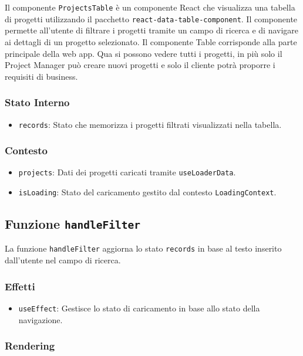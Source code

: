 \documentclass{article}
\begin{document}
Il componente \texttt{ProjectsTable} è un componente React che visualizza una tabella di progetti utilizzando il pacchetto \texttt{react-data-table-component}. Il componente permette all'utente di filtrare i progetti tramite un campo di ricerca e di navigare ai dettagli di un progetto selezionato.
Il componente Table corrisponde alla parte principale della web app. Qua si possono vedere tutti i progetti, in più solo il Project Manager può creare nuovi progetti e solo il cliente potrà proporre i requisiti di business.

\subsubsection*{Stato Interno}
\begin{itemize}
    \item \texttt{records}: Stato che memorizza i progetti filtrati visualizzati nella tabella.
\end{itemize}

\subsubsection*{Contesto}
\begin{itemize}
    \item \texttt{projects}: Dati dei progetti caricati tramite \texttt{useLoaderData}.
    \item \texttt{isLoading}: Stato del caricamento gestito dal contesto \texttt{LoadingContext}.
\end{itemize}

\subsection*{Funzione \texttt{handleFilter}}

La funzione \texttt{handleFilter} aggiorna lo stato \texttt{records} in base al testo inserito dall'utente nel campo di ricerca.


\subsubsection*{Effetti}

\begin{itemize}
    \item \texttt{useEffect}: Gestisce lo stato di caricamento in base allo stato della navigazione.
\end{itemize}

\subsubsection*{Rendering}
\end{document}
